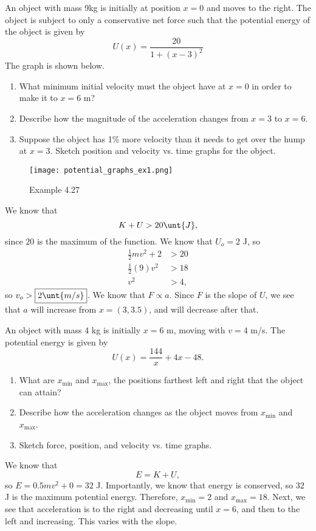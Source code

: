 \documentclass[11pt]{article}
\begin{document}
\begin{example}
	An object with mass 9kg is initially at position $x=0$ and moves to the right. The object is subject to only a conservative net force such that the potential energy of the object is given by
	\[U(x) = \frac{20}{1+(x-3)^2}\]
	The graph is shown below.
	\begin{enumerate}[label=(\Alph*)]
		\item What minimum initial velocity must the object have at $x=0$ in order to make it to $x=6$ m?
		\item Describe how the magnitude of the acceleration changes from $x=3$ to $x=6$.
		\item Suppose the object has 1\% more velocity than it needs to get over the hump at $x=3$. Sketch position and velocity vs. time graphs for the object.
	\end{enumerate}
\end{example}
\begin{figure}[h!]
	\centering
	\texttt{[image: potential\_graphs\_ex1.png]}
	\caption{Example 4.27}
\end{figure}

\begin{solution}
	We know that
	\[K + U > 20\unt{J},\]
	since $20$ is the maximum of the function. We know that $U_o = 2$ J, so
	\begin{align*}
		\frac{1}{2}mv^2 + 2 &> 20 \\
		\frac{1}{2}(9)v^2 &> 18 \\
		v^2 &> 4,
	\end{align*}
	so $v_o > \boxed{2 \unt{m/s}}$. We know that $F \propto a$. Since $F$ is the slope of $U$, we see that $a$ will increase from $x=(3,3.5)$, and will decrease after that.
\end{solution}

\begin{example}
	An object with mass $4$ kg is initially $x=6$ m, moving with $v=4$ m/s. The potential energy is given by
	\[U(x) = \frac{144}{x} + 4x - 48.\]
	\begin{enumerate}[label=(\Alph*)]
		\item What are $x_{\text{min}}$ and $x_{\text{max}}$, the positions farthest left and right that the object can attain?
		\item Describe how the acceleration changes as the object moves from $x_{\text{min}}$ and $x_{\text{max}}$.
		\item Sketch force, position, and velocity vs. time graphs.
	\end{enumerate}
\end{example}
\begin{solution}
	We know that
	\[E = K + U,\]
	so $E = 0.5mv^2 + 0 = 32$ J. Importantly, we know that energy is conserved, so $32$ J is the maximum potential energy. Therefore, $x_{\text{min}} = 2$ and $x_{\text{max}} = 18$. Next, we see that acceleration is to the right and decreasing until $x = 6$, and then to the left and increasing. This varies with the slope.
\end{solution}
\end{document}

